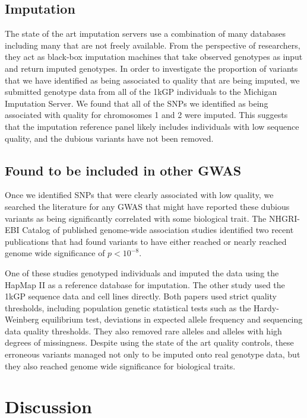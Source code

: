 \documentclass[9pt,lineno]{elife}
\newcommand{\sgcomment}[1]{\textcolor{blue}{SG: #1}}
\begin{document}
\subsection{Imputation}
The state of the art imputation servers use a combination of many databases including many that are not freely available.
From the perspective of researchers, they act as black-box imputation machines that take observed genotypes as input and return imputed genotypes.  
In order to investigate the proportion of variants that we have identified as being associated to quality that are being imputed, we submitted genotype data from all of the 1kGP individuals to the Michigan Imputation Server.
We found that all of the SNPs we identified as being associated with quality for chromosomes 1 and 2 were imputed. 
This suggests that the imputation reference panel likely includes individuals with low sequence quality, and the dubious variants have not been removed. 


\subsection{Found to be included in other GWAS }
Once we identified SNPs that were clearly associated with low quality, we searched the literature for any GWAS that might have reported these dubious variants as being significantly correlated with some biological trait. 
The NHGRI-EBI Catalog of published genome-wide association studies identified two recent publications that had found variants to have either reached or nearly reached genome wide significance of $ p < 10^{-8}$.

One of these studies genotyped individuals and imputed the data using the HapMap II as a reference  database for imputation.
The other study used the 1kGP sequence data and cell lines directly.
Both papers used strict quality thresholds, including population genetic statistical tests such as the Hardy-Weinberg equilibrium test, deviations in expected allele frequency and sequencing data quality thresholds. 
They also removed rare alleles and alleles with high degrees of missingness. 
Despite using the state of the art quality controls, these erroneous variants managed not only to be imputed onto real genotype data, but they also reached genome wide significance for biological traits.

\section{Discussion}
\end{document}
